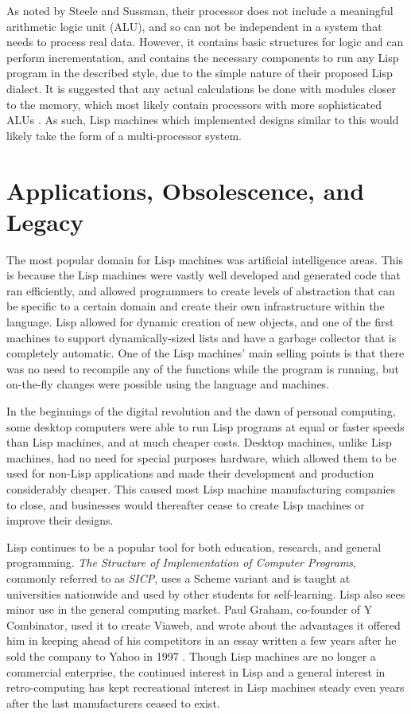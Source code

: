 \documentclass[journal]{IEEEtran}
\begin{document}
As noted by Steele and Sussman, their processor does not include a meaningful arithmetic logic unit (ALU), and so can not be independent in a system that needs to process real data. However, it contains basic structures for logic and can perform incrementation, and contains the necessary components to run any Lisp program in the described style, due to the simple nature of their proposed Lisp dialect. It is suggested that any actual calculations be done with modules closer to the memory, which most likely contain processors with more sophisticated ALUs \cite{ss}. As such, Lisp machines which implemented designs similar to this would likely take the form of a multi-processor system.

\section{Applications, Obsolescence, and Legacy}
The most popular domain for Lisp machines was  artificial intelligence areas.  This is because the Lisp machines were vastly well developed and generated code that ran efficiently, and allowed programmers to create levels of abstraction that can be specific to a certain domain and create their own infrastructure within the language. Lisp allowed for dynamic creation of new objects, and one of the first machines to support dynamically-sized lists and have a garbage collector that is completely automatic. One of the Lisp machines' main selling points is that there was no need to recompile any of the functions while the program is running, but on-the-fly changes were possible using the language and machines.

In the beginnings of the digital revolution and the dawn of personal computing, some desktop computers were able to run Lisp programs at equal or faster speeds than Lisp machines, and at much cheaper costs. Desktop machines, unlike Lisp machines, had no need for special purposes hardware, which allowed them to be used for non-Lisp applications and made their development and production considerably cheaper. This caused most Lisp machine manufacturing companies to close, and businesses would thereafter cease to create Lisp machines or improve their designs.

Lisp continues to be a popular tool for both education, research, and general programming. \textit{The Structure of Implementation of Computer Programs}, commonly referred to as \textit{SICP}, uses a Scheme variant and is taught at universities nationwide and used by other students for self-learning. Lisp also sees minor use in the general computing market. Paul Graham, co-founder of Y Combinator, used it to create Viaweb, and wrote about the advantages it offered him in keeping ahead of his competitors in an essay written a few years after he sold the company to Yahoo in 1997 \cite{graham}. Though Lisp machines are no longer a commercial enterprise, the continued interest in Lisp and a general interest in retro-computing has kept recreational interest in Lisp machines steady even years after the last manufacturers ceased to exist.

\printbibliography

\end{document}
